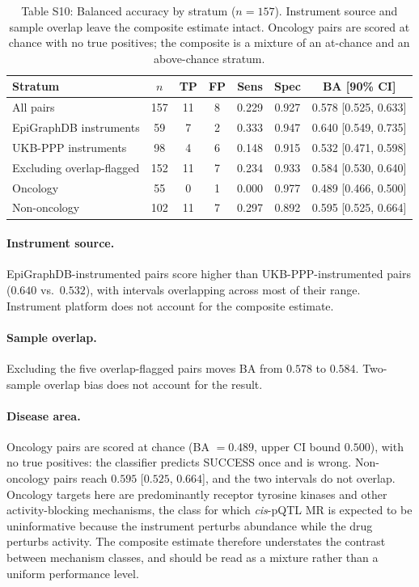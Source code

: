 \documentclass[11pt]{article}
\begin{document}
\vspace{1em}
\begin{table}[H]
\centering
\caption{Table S10: Balanced accuracy by stratum ($n = 157$). Instrument source and sample overlap leave the composite estimate intact. Oncology pairs are scored at chance with no true positives; the composite is a mixture of an at-chance and an above-chance stratum.}
\label{tab:strat}
\small
\begin{tabular}{lcccccc}
\toprule
Stratum & $n$ & TP & FP & Sens & Spec & BA [90\% CI] \\
\midrule
All pairs & 157 & 11 & 8 & 0.229 & 0.927 & 0.578 [0.525, 0.633] \\
\midrule
EpiGraphDB instruments & 59 & 7 & 2 & 0.333 & 0.947 & 0.640 [0.549, 0.735] \\
UKB-PPP instruments & 98 & 4 & 6 & 0.148 & 0.915 & 0.532 [0.471, 0.598] \\
\midrule
Excluding overlap-flagged & 152 & 11 & 7 & 0.234 & 0.933 & 0.584 [0.530, 0.640] \\
\midrule
Oncology & 55 & 0 & 1 & 0.000 & 0.977 & 0.489 [0.466, 0.500] \\
Non-oncology & 102 & 11 & 7 & 0.297 & 0.892 & 0.595 [0.525, 0.664] \\
\bottomrule
\end{tabular}
\end{table}

\paragraph{Instrument source.}
EpiGraphDB-instrumented pairs score higher than UKB-PPP-instrumented pairs ($0.640$ vs.\ $0.532$), with intervals overlapping across most of their range. Instrument platform does not account for the composite estimate.

\paragraph{Sample overlap.}
Excluding the five overlap-flagged pairs moves BA from $0.578$ to $0.584$. Two-sample overlap bias does not account for the result.

\paragraph{Disease area.}
Oncology pairs are scored at chance (BA $= 0.489$, upper CI bound $0.500$), with no true positives: the classifier predicts SUCCESS once and is wrong. Non-oncology pairs reach $0.595$ [$0.525$, $0.664$], and the two intervals do not overlap. Oncology targets here are predominantly receptor tyrosine kinases and other activity-blocking mechanisms, the class for which \emph{cis}-pQTL MR is expected to be uninformative because the instrument perturbs abundance while the drug perturbs activity. The composite estimate therefore understates the contrast between mechanism classes, and should be read as a mixture rather than a uniform performance level.
\end{document}
